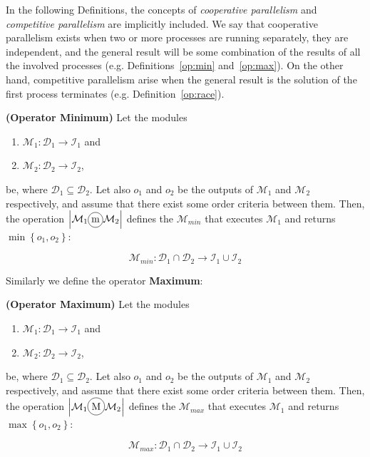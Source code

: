 In the following Definitions, the concepts of {\it cooperative parallelism} and {\it competitive parallelism} are implicitly included. We say that cooperative parallelism exists when two or more processes are running separately, they are independent, and the general result will be some combination of the results of all the involved processes (e.g. Definitions~\ref{op:min} and~\ref{op:max}). On the other hand, competitive parallelism arise when the general result is the solution of the first process terminates (e.g. Definition~\ref{op:race}).

\begin{definition}\label{op:min}
{\bf (Operator Minimum)} Let the modules
\begin{enumerate}%
	\item $\mathcal{M}_1 : \mathcal{D}_1 \rightarrow \mathcal{I}_1$ and  
	\item $\mathcal{M}_2 : \mathcal{D}_2 \rightarrow \mathcal{I}_2$,
\end{enumerate}%
be, where $\mathcal{D}_1 \subseteq \mathcal{D}_2$. %
Let also $o_1$ and $o_2$ be the outputs of $\mathcal{M}_1$ and $\mathcal{M}_2$ respectively, and assume that there exist some order criteria between them. Then, the operation $\left|\mathcal{M}_1\circled{m}\mathcal{M}_2\right|$ defines the \cm{} $\mathcal{M}_{min}$ that executes $\mathcal{M}_1$ and returns $\min\left\{o_1,o_2\right\}$:

\[
\mathcal{M}_{min}:\mathcal{D}_1\cap\mathcal{D}_2 \rightarrow \mathcal{I}_1 \cup \mathcal{I}_2 
\]
\end{definition}

Similarly we define the operator \textbf{Maximum}:

\begin{definition}\label{op:max}
{\bf (Operator Maximum)} Let the modules
\begin{enumerate}%
	\item $\mathcal{M}_1 : \mathcal{D}_1 \rightarrow \mathcal{I}_1$ and  
	\item $\mathcal{M}_2 : \mathcal{D}_2 \rightarrow \mathcal{I}_2$,
\end{enumerate}%
be, where $\mathcal{D}_1 \subseteq \mathcal{D}_2$. %
Let also $o_1$ and $o_2$ be the outputs of $\mathcal{M}_1$ and $\mathcal{M}_2$ respectively, and assume that there exist some order criteria between them. Then, the operation $\left|\mathcal{M}_1\circled{M}\mathcal{M}_2\right|$ defines the \cm{} $\mathcal{M}_{max}$ that executes $\mathcal{M}_1$ and returns $\max\left\{o_1,o_2\right\}$:

\[
\mathcal{M}_{max}:\mathcal{D}_1\cap\mathcal{D}_2 \rightarrow \mathcal{I}_1 \cup \mathcal{I}_2 
\]
\end{definition}

